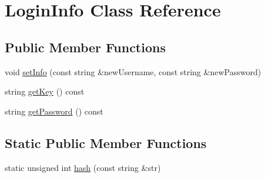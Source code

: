\hypertarget{class_login_info}{\section{Login\-Info Class Reference}
\label{class_login_info}
}
\subsection*{Public Member Functions}
\begin{DoxyCompactItemize}
\item 
void \hyperlink{class_login_info_a586b57ec9c89876ccbf5824a6ae5d4c3}{set\-Info} (const string \&new\-Username, const string \&new\-Password)
\item 
string \hyperlink{class_login_info_a411a109569778357f30983baf84be761}{get\-Key} () const 
\item 
string \hyperlink{class_login_info_ade7dccc3354bc000a774f089c0afb4b0}{get\-Password} () const 
\end{DoxyCompactItemize}
\subsection*{Static Public Member Functions}
\begin{DoxyCompactItemize}
\item 
static unsigned int \hyperlink{class_login_info_afccfb628b9806e6d19399fa36a3b13c1}{hash} (const string \&str)
\end{DoxyCompactItemize}



